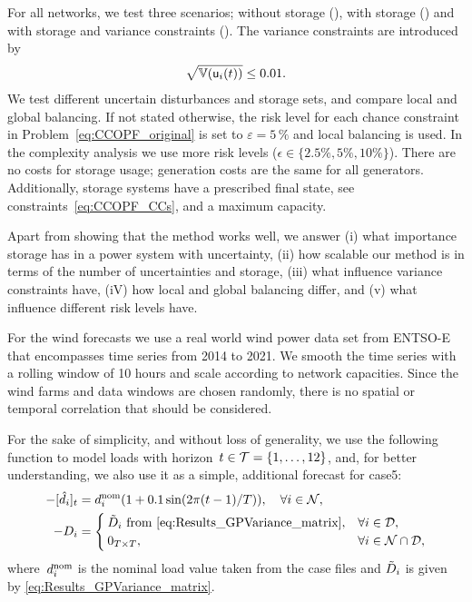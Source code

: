 \documentclass[final,3p,times,twocolumn]{elsarticle}  %
\begin{document}
For all networks, we test three scenarios; without storage (\caseNoStorage), with storage (\caseStorage) and with storage and variance constraints (\caseStorageWithVariance). The variance constraints are introduced by
\begin{align}
\label{eq:VarianceConstraint}
\sqrt{\mathbb{V}(\mathsf{u}_i(t))} \leq 0.01.
\end{align}
We test different uncertain disturbances and storage sets, and compare local and global balancing. 
If not stated otherwise, the risk level for each chance constraint in Problem~\eqref{eq:CCOPF_original} is set to $\varepsilon = 5\,\%$ and local balancing is used. In the complexity analysis we use more risk levels ($\epsilon\in\{2.5\%, 5\%, 10\%\}$). 
There are no costs for storage usage; generation costs are the same for all generators. Additionally, storage systems have a prescribed final state, see constraints~\eqref{eq:CCOPF_CCs}, and a maximum capacity.

Apart from showing that the method works well, we answer (i) what importance storage has in a power system with uncertainty, (ii) how scalable our method is in terms of the number of uncertainties and storage, (iii) what influence variance constraints have, (iV) how local and global balancing differ, and (v) what influence different risk levels have.

For the wind forecasts we use a real world wind power data set from ENTSO-E \cite{de_felice_matteo_2021_4682697} that encompasses time series from 2014 to 2021. We smooth the time series with a rolling window of 10 hours and scale according to network capacities. Since the wind farms and data windows are chosen randomly, there is no spatial or temporal correlation that should be considered.

For the sake of simplicity, and without loss of generality, we use the following function to model loads with horizon~$t \in\mathcal{T} = \{1,\dots,12\}$, and, for better understanding, we also use it as a simple, additional forecast for case5:
\begin{subequations}
\label{eq:artificial_forecast}
	\begin{align}
	- [\hat{\load}_i]_t & =  \load_{i}^{\text{nom}} (1 + 0.1 \sin(2 \pi (t-1)/\horizon)), \quad \forall i \in \mathcal{\nbus},\\
	- \Load_i &= 
	\begin{cases}
	\tilde\Load_i \text{ from \eqref{eq:Results_GPVariance_matrix}}, & \forall i \in \mathcal{\Load},\\
	0_{\horizon \times \horizon}, & \forall i \in \mathcal{\nbus} \cap \mathcal{\Load},
	\end{cases}
	\end{align}
\end{subequations}
where~$d_{i}^{\text{nom}}$ is the nominal load value taken from the case files and $\tilde\Load_i$ is given by \eqref{eq:Results_GPVariance_matrix}.
\end{document}

